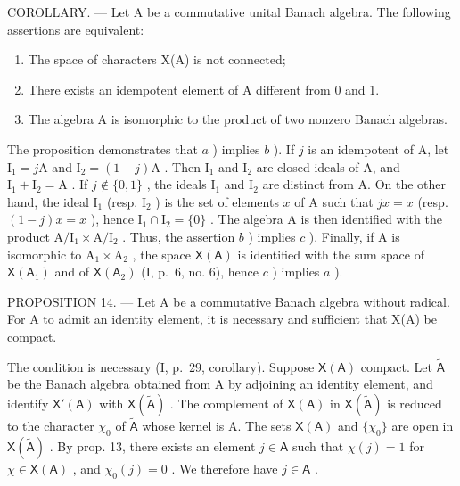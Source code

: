 COROLLARY. --- Let A be a commutative unital Banach algebra. The following assertions are equivalent:

\begin{enumerate}
\def\labelenumi{\alph{enumi})}
\item
  The space of characters X(A) is not connected;
\item
  There exists an idempotent element of A different from 0 and 1.
\item
  The algebra A is isomorphic to the product of two nonzero Banach algebras.
\end{enumerate}

The proposition demonstrates that \(a\) ) implies \(b\) ). If \(j\) is an idempotent of A, let \(\mathrm{I}_1 = j\mathrm{A}\) and \(\mathrm{I}_2 = (1 - j)\mathrm{A}\) . Then \(\mathrm{I}_1\) and \(\mathrm{I}_2\) are closed ideals of A, and \(\mathrm{I}_1 + \mathrm{I}_2 = \mathrm{A}\) . If \(j \notin \{0,1\}\) , the ideals \(\mathrm{I}_1\) and \(\mathrm{I}_2\) are distinct from A. On the other hand, the ideal \(\mathrm{I}_1\) (resp. \(\mathrm{I}_2\) ) is the set of elements \(x\) of A such that \(jx = x\) (resp. \((1 - j)x = x\) ), hence \(\mathrm{I}_1 \cap \mathrm{I}_2 = \{0\}\) . The algebra A is then identified with the product \(\mathrm{A} / \mathrm{I}_1 \times \mathrm{A} / \mathrm{I}_2\) . Thus, the assertion \(b\) ) implies \(c\) ). Finally, if A is isomorphic to \(\mathrm{A}_1 \times \mathrm{A}_2\) , the space \(\mathsf{X}(\mathsf{A})\) is identified with the sum space of \(\mathsf{X}(\mathsf{A}_1)\) and of \(\mathsf{X}(\mathsf{A}_2)\) (I, p.~6, no. 6), hence \(c\) ) implies \(a\) ).

PROPOSITION 14. --- Let A be a commutative Banach algebra without radical. For A to admit an identity element, it is necessary and sufficient that X(A) be compact.

The condition is necessary (I, p.~29, corollary). Suppose \(\mathsf{X}(\mathsf{A})\) compact. Let \(\widetilde{\mathsf{A}}\) be the Banach algebra obtained from A by adjoining an identity element, and identify \(\mathsf{X}'(\mathsf{A})\) with \(\mathsf{X}(\widetilde{\mathsf{A}})\) . The complement of \(\mathsf{X}(\mathsf{A})\) in \(\mathsf{X}(\widetilde{\mathsf{A}})\) is reduced to the character \(\chi_0\) of \(\widetilde{\mathsf{A}}\) whose kernel is A. The sets \(\mathsf{X}(\mathsf{A})\) and \(\{\chi_0\}\) are open in \(\mathsf{X}(\widetilde{\mathsf{A}})\) . By prop. 13, there exists an element \(j \in \mathsf{A}\) such that \(\chi(j) = 1\) for \(\chi \in \mathsf{X}(\mathsf{A})\) , and \(\chi_0(j) = 0\) . We therefore have \(j \in \mathsf{A}\) .

